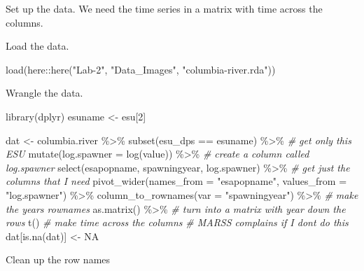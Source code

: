 \documentclass[
]{article}
\newenvironment{Shaded}{\begin{snugshade}}{\end{snugshade}}
\newcommand{\AttributeTok}[1]{\textcolor[rgb]{0.77,0.63,0.00}{#1}}
\newcommand{\CommentTok}[1]{\textcolor[rgb]{0.56,0.35,0.01}{\textit{#1}}}
\newcommand{\ConstantTok}[1]{\textcolor[rgb]{0.00,0.00,0.00}{#1}}
\newcommand{\DecValTok}[1]{\textcolor[rgb]{0.00,0.00,0.81}{#1}}
\newcommand{\FunctionTok}[1]{\textcolor[rgb]{0.00,0.00,0.00}{#1}}
\newcommand{\NormalTok}[1]{#1}
\newcommand{\OtherTok}[1]{\textcolor[rgb]{0.56,0.35,0.01}{#1}}
\newcommand{\SpecialCharTok}[1]{\textcolor[rgb]{0.00,0.00,0.00}{#1}}
\newcommand{\StringTok}[1]{\textcolor[rgb]{0.31,0.60,0.02}{#1}}
\begin{document}
Set up the data. We need the time series in a matrix with time across
the columns.

Load the data.

\begin{Shaded}
\begin{Highlighting}[]
\FunctionTok{load}\NormalTok{(here}\SpecialCharTok{::}\FunctionTok{here}\NormalTok{(}\StringTok{"Lab{-}2"}\NormalTok{, }\StringTok{"Data\_Images"}\NormalTok{, }\StringTok{"columbia{-}river.rda"}\NormalTok{))}
\end{Highlighting}
\end{Shaded}

Wrangle the data.

\begin{Shaded}
\begin{Highlighting}[]
\FunctionTok{library}\NormalTok{(dplyr)}
\NormalTok{esuname }\OtherTok{\textless{}{-}}\NormalTok{ esu[}\DecValTok{2}\NormalTok{]}

\NormalTok{dat }\OtherTok{\textless{}{-}}\NormalTok{ columbia.river }\SpecialCharTok{\%\textgreater{}\%} 
  \FunctionTok{subset}\NormalTok{(esu\_dps }\SpecialCharTok{==}\NormalTok{ esuname) }\SpecialCharTok{\%\textgreater{}\%} \CommentTok{\# get only this ESU}
  \FunctionTok{mutate}\NormalTok{(}\AttributeTok{log.spawner =} \FunctionTok{log}\NormalTok{(value)) }\SpecialCharTok{\%\textgreater{}\%} \CommentTok{\# create a column called log.spawner}
  \FunctionTok{select}\NormalTok{(esapopname, spawningyear, log.spawner) }\SpecialCharTok{\%\textgreater{}\%} \CommentTok{\# get just the columns that I need}
  \FunctionTok{pivot\_wider}\NormalTok{(}\AttributeTok{names\_from =} \StringTok{"esapopname"}\NormalTok{, }\AttributeTok{values\_from =} \StringTok{"log.spawner"}\NormalTok{) }\SpecialCharTok{\%\textgreater{}\%} 
  \FunctionTok{column\_to\_rownames}\NormalTok{(}\AttributeTok{var =} \StringTok{"spawningyear"}\NormalTok{) }\SpecialCharTok{\%\textgreater{}\%} \CommentTok{\# make the years rownames}
  \FunctionTok{as.matrix}\NormalTok{() }\SpecialCharTok{\%\textgreater{}\%} \CommentTok{\# turn into a matrix with year down the rows}
  \FunctionTok{t}\NormalTok{() }\CommentTok{\# make time across the columns}
\CommentTok{\# MARSS complains if I don\textquotesingle{}t do this}
\NormalTok{dat[}\FunctionTok{is.na}\NormalTok{(dat)] }\OtherTok{\textless{}{-}} \ConstantTok{NA}
\end{Highlighting}
\end{Shaded}

Clean up the row names
\end{document}

